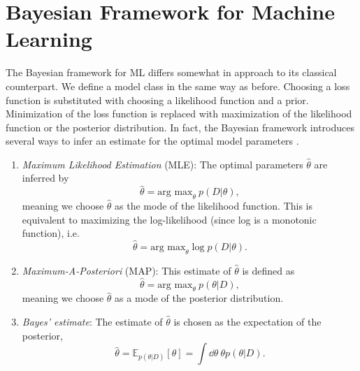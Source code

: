 \section{Bayesian Framework for Machine Learning}
The Bayesian framework for ML differs somewhat in approach to its classical counterpart.
We define a model class in the same way as before. Choosing a loss function is substituted with
choosing a likelihood function and a prior.
Minimization of the loss function is replaced with maximization of the likelihood function or the posterior distribution. In fact,
the Bayesian framework introduces several ways to infer an estimate for the optimal model parameters \cite{ml_for_physicists}.
\begin{enumerate}
    \item \textit{Maximum Likelihood Estimation} (MLE): The optimal parameters $\hat{\theta}$ are inferred by
    \begin{equation}\label{eq:mle}
        \hat{\theta} = \text{arg max}_\theta \ p(D|\theta),
    \end{equation}
    meaning we choose $\hat{\theta}$ as the mode of the likelihood function.
    This is equivalent to maximizing the log-likelihood (since log is a monotonic function), i.e.
    \begin{equation}\label{eq:map}
        \hat{\theta} = \text{arg max}_\theta \log p(D|\theta).
    \end{equation}
    \item \textit{Maximum-A-Posteriori} (MAP): This estimate of $\hat{\theta}$ is defined as
    \begin{equation}
        \hat{\theta} = \text{arg max}_\theta \ p(\theta|D),
    \end{equation}
    meaning we choose $\hat{\theta}$ as a mode of the posterior distribution.
    \item \textit{Bayes' estimate}: The estimate of $\hat{\theta}$ is chosen as the expectation of the posterior,
    \begin{equation}
        \hat{\theta} = \mathbb{E}_{p(\theta|D)}[\theta] = \int \dd \theta \ \theta p(\theta|D).
    \end{equation}
\end{enumerate}

